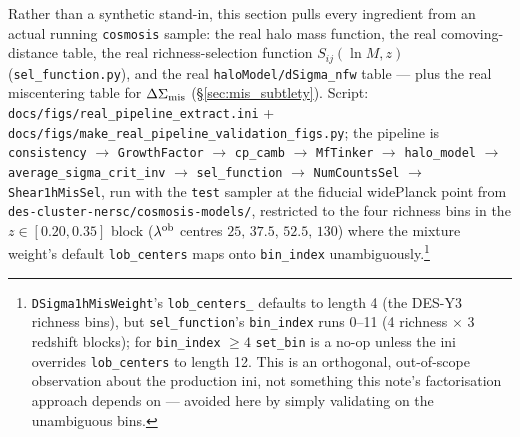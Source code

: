 \documentclass[a4paper, 11pt]{article}
\newcommand{\lnM}{\ln M}
\begin{document}
Rather than a synthetic stand-in, this section pulls every ingredient
from an actual running \texttt{cosmosis} sample: the real halo mass
function, the real comoving-distance table, the real
richness-selection function $S_{ij}(\lnM,z)$
(\texttt{sel\_function.py}), and the real
\texttt{haloModel/dSigma\_nfw} table --- plus the real
miscentering table for $\Delta\Sigma_{\rm mis}$
(\S\ref{sec:mis_subtlety}). Script:
\texttt{docs/figs/real\_pipeline\_extract.ini} +
\texttt{docs/figs/make\_real\_pipeline\_validation\_figs.py}; the
pipeline is
\texttt{consistency} $\to$ \texttt{GrowthFactor} $\to$ \texttt{cp\_camb}
$\to$ \texttt{MfTinker} $\to$ \texttt{halo\_model} $\to$
\texttt{average\_sigma\_crit\_inv} $\to$ \texttt{sel\_function} $\to$
\texttt{NumCountsSel} $\to$ \texttt{Shear1hMisSel},
run with the \texttt{test} sampler at the fiducial widePlanck point
from \texttt{des-cluster-nersc/cosmosis-models/}, restricted to the
four richness bins in the $z\in[0.20,0.35]$ block
($\lambda^{\rm ob}$ centres $25,\,37.5,\,52.5,\,130$) where the
mixture weight's default \texttt{lob\_centers} maps onto
\texttt{bin\_index} unambiguously.\footnote{\texttt{DSigma1hMisWeight}'s
\texttt{lob\_centers\_} defaults to length 4 (the DES-Y3 richness
bins), but \texttt{sel\_function}'s \texttt{bin\_index} runs 0--11
(4 richness $\times$ 3 redshift blocks); for \texttt{bin\_index}
$\ge4$ \texttt{set\_bin} is a no-op unless the ini overrides
\texttt{lob\_centers} to length 12. This is an orthogonal,
out-of-scope observation about the production ini, not something
this note's factorisation approach depends on --- avoided here by
simply validating on the unambiguous bins.}
\end{document}
